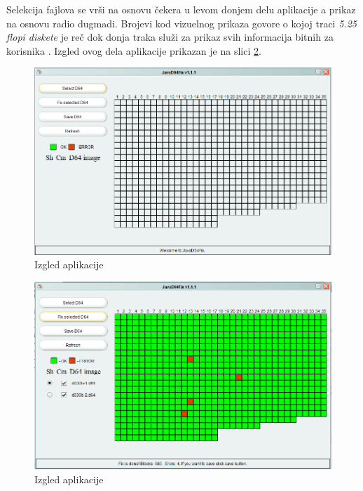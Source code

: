 Selekcija fajlova se vrši na osnovu čekera u levom donjem delu aplikacije a prikaz na osnovu radio dugmadi. Brojevi kod vizuelnog prikaza govore o kojoj traci \textit{5.25 flopi diskete} je reč dok donja traka služi za prikaz svih informacija bitnih za korisnika \cite{Projekat}. Izgled ovog dela aplikacije prikazan je na slici \ref{img:aplikacija1}.

\begin{figure}[ht]
\begin{center}
\includegraphics[width=\textwidth]{img/aplikacija.png}
\caption{Izgled aplikacije}
\label{img:aplikacija}
\end{center}
\end{figure}

\begin{figure}[ht]
\begin{center}
\includegraphics[width=\textwidth]{img/aplikacija1.png}
\caption{Izgled aplikacije}
\label{img:aplikacija1}
\end{center}
\end{figure}

